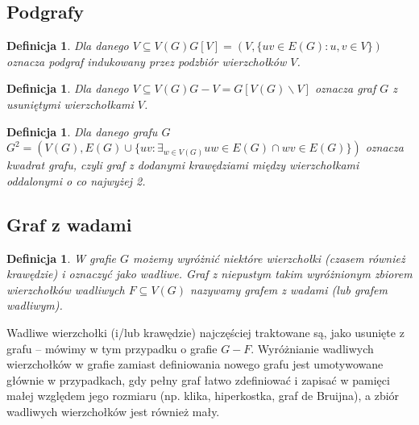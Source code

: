 \documentclass{pracamgr}
\newtheorem{defi}[theorem]{Definicja}
\begin{document}
   \subsection{Podgrafy}
    \begin{defi}\label{podgraf indukowany}
     Dla danego $V\subseteq V(G)$\quad $G[V]=(V,\{uv\in E(G):u,v\in V\})$ oznacza \emph{podgraf indukowany} przez podzbiór wierzchołków $V$.
    \end{defi}
    \begin{defi}\label{roznica grafow}
     Dla danego $V\subseteq V(G)$\quad $G-V=G[V(G)\backslash V]$ oznacza \emph{graf $G$ z usuniętymi wierzchołkami $V$}.
    \end{defi}
    \begin{defi}\label{kwadrat grafu}
     Dla danego grafu $G$\newline $G^2=(V(G),E(G)\cup\{uv:\exists_{w\in V(G)}uw\in E(G)\cap wv\in E(G)\})$
     oznacza \emph{kwadrat grafu}, czyli graf z dodanymi krawędziami między wierzchołkami oddalonymi o co najwyżej 2.
    \end{defi}
   \subsection{Graf z wadami}
    \begin{defi}\label{graf z wadami}
     W grafie $G$ możemy wyróżnić niektóre wierzchołki (czasem również krawędzie) i oznaczyć jako wadliwe.
     Graf z niepustym takim wyróżnionym zbiorem wierzchołków wadliwych $F\subseteq V(G)$ nazywamy \emph{grafem z wadami} (lub \emph{grafem wadliwym}).
    \end{defi}
    Wadliwe wierzchołki (i/lub krawędzie) najczęściej traktowane są, jako usunięte z grafu -- mówimy w tym przypadku o grafie $G-F$.
    Wyróżnianie wadliwych wierzchołków w grafie zamiast definiowania nowego grafu jest umotywowane głównie w przypadkach,
    gdy pełny graf łatwo zdefiniować i zapisać w pamięci małej względem jego rozmiaru (np. klika, hiperkostka, graf de Bruijna),
    a zbiór wadliwych wierzchołków jest również mały.
\end{document}
